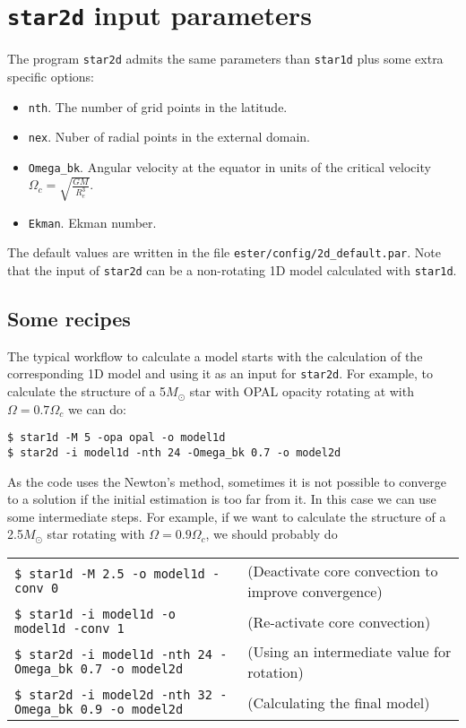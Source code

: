 \section{{\tt star2d} input parameters}

The program {\tt star2d} admits the same parameters than {\tt star1d} plus some extra
specific options:
\begin{itemize}
\item {\tt nth}. The number of grid points in the latitude.
\item {\tt nex}. Nuber of radial points in the external domain.
\item {\tt Omega\_bk}. Angular velocity at the equator in units of the critical velocity
$\Omega_c=\sqrt{\frac{GM}{R_e^3}}$.
\item {\tt Ekman}. Ekman number.
\end{itemize}

The default values are written in the file {\tt ester/config/2d\_default.par}.
Note that the input of {\tt star2d} can be a non-rotating 1D model calculated 
with {\tt star1d}.
\subsection{Some recipes}
The typical workflow to calculate a model starts with the calculation of the corresponding
1D model and using it as an input for {\tt star2d}. For example, to calculate 
the structure of a 5$M_\odot$ star with OPAL opacity rotating at with $\Omega=0.7\Omega_c$
we can do:
\begin{verbatim}
$ star1d -M 5 -opa opal -o model1d
$ star2d -i model1d -nth 24 -Omega_bk 0.7 -o model2d
\end{verbatim}

As the code uses the Newton's method, sometimes it is not possible to converge to a solution
if the initial estimation is too far from it. In this case we can use some intermediate steps.
For example, if we want to calculate the structure of a 2.5$M_\odot$ star rotating with 
$\Omega=0.9\Omega_c$, we should probably do

\medskip
\noindent\begin{tabular}{lp{4.5cm}}
\verb|$ star1d -M 2.5 -o model1d -conv 0 | 
&(Deactivate core convection to improve convergence)\\
\verb|$ star1d -i model1d -o model1d -conv 1| &
(Re-activate core convection)\\
\verb|$ star2d -i model1d -nth 24 -Omega_bk 0.7 -o model2d| &
(Using an intermediate value for rotation) \\
\verb|$ star2d -i model2d -nth 32 -Omega_bk 0.9 -o model2d| &
(Calculating the final model) 
\end{tabular}
\medskip

